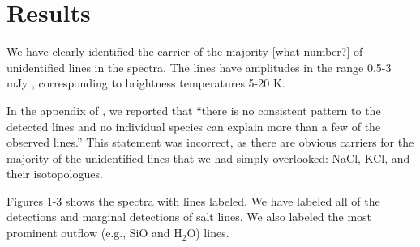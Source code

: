 \documentclass[twocolumn]{aastex62}
\begin{document}
\section{Results}
We have clearly identified the carrier of the majority [what number?]
of unidentified lines in the \citet{Ginsburg2018b} spectra.
The lines have amplitudes in the range 0.5-3 mJy \perbeam, corresponding
to brightness temperatures 5-20 K.

In the appendix of \citet{Ginsburg2018b}, we reported that ``there is no
consistent pattern to the detected lines and no individual species can explain
more than a few of the observed lines.''  This statement was incorrect, as
there are obvious carriers for the majority of the unidentified lines that we
had simply overlooked: NaCl, KCl, and their isotopologues.

Figures 1-3 shows the spectra with lines labeled.  We have labeled all of the
detections and marginal detections of salt lines.  We also labeled the most
prominent outflow (e.g., SiO and H$_2$O) lines.
\end{document}
